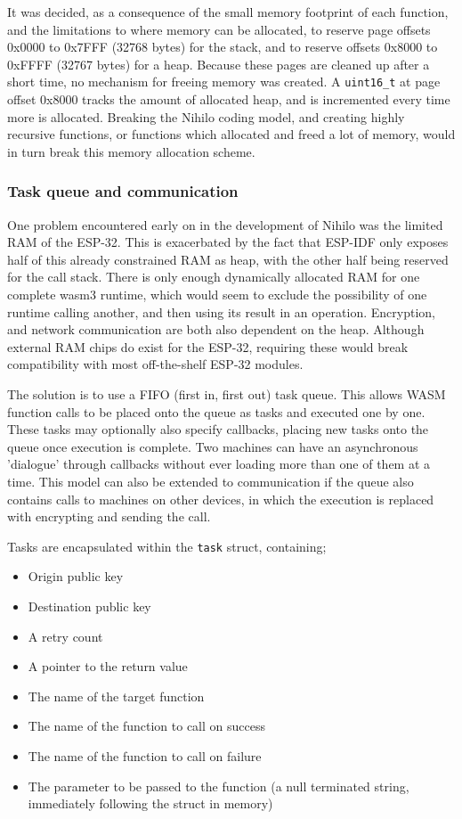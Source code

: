 \documentclass{article}
\begin{document}
It was decided, as a consequence of the small memory footprint of each function, and the limitations to where memory can be allocated, to reserve page offsets 0x0000 to 0x7FFF (32768 bytes) for the stack, and to reserve offsets 0x8000 to 0xFFFF (32767 bytes) for a heap. Because these pages are cleaned up after a short time, no mechanism for freeing memory was created. A \texttt{uint16\_t} at page offset 0x8000 tracks the amount of allocated heap, and is incremented every time more is allocated. Breaking the Nihilo coding model, and creating highly recursive functions, or functions which allocated and freed a lot of memory, would in turn break this memory allocation scheme.


\subsubsection{Task queue and communication}

One problem encountered early on in the development of Nihilo was the limited RAM of the ESP-32. This is exacerbated by the fact that ESP-IDF only exposes half of this already constrained RAM as heap, with the other half being reserved for the call stack. There is only enough dynamically allocated RAM for one complete wasm3 runtime, which would seem to exclude the possibility of one runtime calling another, and then using its result in an operation. Encryption, and network communication are both also dependent on the heap. Although external RAM chips do exist for the ESP-32, requiring these would break compatibility with most off-the-shelf ESP-32 modules.

The solution is to use a FIFO (first in, first out) task queue. This allows WASM function calls to be placed onto the queue as tasks and executed one by one. These tasks may optionally also specify callbacks, placing new tasks onto the queue once execution is complete. Two machines can have an asynchronous 'dialogue' through callbacks without ever loading more than one of them at a time. This model can also be extended to communication if the queue also contains calls to machines on other devices, in which the execution is replaced with encrypting and sending the call.

Tasks are encapsulated within the \texttt{task} struct, containing;
\begin{itemize}
\item Origin public key
\item Destination public key
\item A retry count
\item A pointer to the return value
\item The name of the target function
\item The name of the function to call on success
\item The name of the function to call on failure
\item The parameter to be passed to the function (a null terminated string, immediately following the struct in memory)
\end{itemize}
\end{document}
